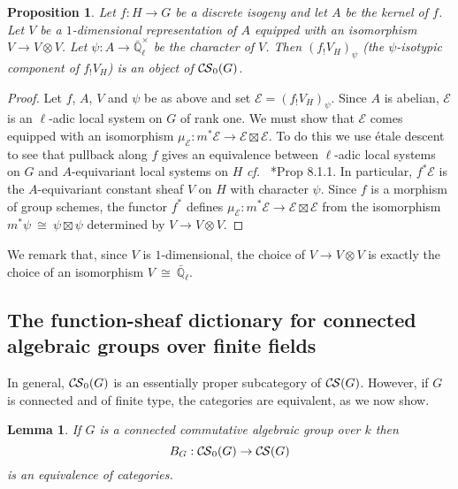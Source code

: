 \documentclass[10pt]{amsart}
\theoremstyle{plain}
\newtheorem{proposition}[theorem]{Proposition}
\newtheorem{lemma}[theorem]{Lemma}
\theoremstyle{definition}
\theoremstyle{remark}
\newcommand{\EE}{\mathbb{\bar Q}_\ell}
\newcommand{\Fq}{k}
\newcommand{\EEx}{\EE^\times}
\newcommand{\iso}{{\ \cong\ }}
\newcommand{\cs}[1]{{\mathcal{#1}}}
\newcommand{\CS}{{\mathcal{C\hskip-0.8pt S}}}
\newcommand{\bCS}{{\CS_0}}
\begin{document}
\begin{proposition}\label{prop:finite}
Let $f: H \to G$ be a discrete isogeny and let $A$ be the kernel of $f$.
Let $V$ be a $1$-dimensional representation of $A$ 
equipped with an isomorphism $V\to V\otimes V$.
Let $\psi : A \to \EEx$ be the character of $V$.
Then $(f_! V_H)_\psi$ (the $\psi$-isotypic component of $f_!V_H$) is an object of $\bCS(G)$.
\end{proposition}

\begin{proof}
Let $f$, $A$, $V$ and $\psi$ be as above and set $\cs{E} = (f_! V_H)_\psi$.
Since $A$ is abelian, $\cs{E}$ is an $\ell$-adic local system on $G$ of rank one.
We must show that $\cs{E}$ comes equipped with an isomorphism $\mu_\cs{E} : m^* \cs{E} \to \cs{E}\boxtimes\cs{E}$.
To do this we use \'etale descent to see that pullback along $f$ gives an equivalence between $\ell$-adic local systems on $G$ and $A$-equivariant local systems on $H$ {\it cf.\ } \cite{bernstein-luntz:equivariant_sheaves}*{Prop 8.1.1}. 
In particular, $f^*\cs{E}$ is the $A$-equivariant constant sheaf $V$ on $H$ with character $\psi$.
Since $f$ is a morphism of group schemes, the functor $f^*$ defines $\mu_\cs{E} : m^*\cs{E} \to \cs{E}\boxtimes\cs{E}$
from the isomorphism $m^*\psi \iso \psi \boxtimes\psi$ determined by $V\to V\otimes V$.
\end{proof}

We remark that, since $V$ is $1$-dimensional, the choice of $V \to V\otimes V$ is exactly the choice of an isomorphism $V\iso \EE$.

\subsection{The function-sheaf dictionary for connected algebraic groups over finite fields}\label{ssec:connected}

In general, $\bCS(G)$ is an essentially
proper subcategory of $\CS(G)$. 
However, if $G$ is connected and of finite type, the categories are equivalent, as we now show.

\begin{lemma}\label{lem:bounded_connected}
If $G$ is a connected commutative algebraic group over $\Fq$ then 
\[
B_G : \bCS(G) \to \CS(G)
\]
 is an equivalence of categories.
\end{lemma}
\end{document}
